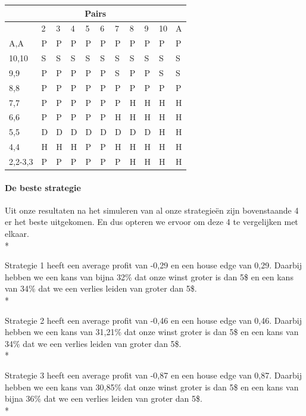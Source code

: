 \documentclass[conference]{IEEEtran}
\begin{document}
\begin{table}[ht]
\begin{tabular}{|l|l|l|l|l|l|l|l|l|l|l|}
\multicolumn{11}{|c|}{\textbf{Pairs}}                                 \\ \hline
                             & 2 & 3 & 4 & 5 & 6 & 7 & 8 & 9 & 10 & A \\ \hline
A,A                          & P & P & P & P & P & P & P & P & P & P  \\ \hline
10,10                        & S & S & S & S & S & S & S & S & S & S  \\ \hline
9,9                          & P & P & P & P & P & S & P & P & S & S  \\ \hline
8,8                          & P & P & P & P & P & P & P & P & P & P  \\ \hline
7,7                          & P & P & P & P & P & P & H & H & H & H  \\ \hline
6,6                          & P & P & P & P & P & H & H & H & H & H  \\ \hline
5,5                          & D & D & D & D & D & D & D & D & H & H  \\ \hline
4,4                          & H & H & H & P & P & H & H & H & H & H  \\ \hline
2,2-3,3                      & P & P & P & P & P & P & H & H & H & H  \\ \hline
\end{tabular}
\end{table}

\paragraph{De beste strategie}

Uit onze resultaten na het simuleren van al onze strategie\"en zijn bovenstaande 4 er het beste uitgekomen. En dus opteren we ervoor om deze 4 te vergelijken met elkaar. \\*

Strategie 1 heeft een average profit van -0,29 en een house edge van 0,29. Daarbij hebben we een kans van bijna 32\% dat onze winst groter is dan 5\$ en een kans van 34\% dat we een verlies leiden van groter dan 5\$. \\*

Strategie 2 heeft een average profit van -0,46 en een house edge van 0,46. Daarbij hebben we een kans van 31,21\% dat onze winst groter is dan 5\$ en een kans van 34\% dat we een verlies leiden van groter dan 5\$.\\*

Strategie 3 heeft een average profit van -0,87 en een house edge van 0,87. Daarbij hebben we een kans van 30,85\% dat onze winst groter is dan 5\$ en een kans van bijna 36\% dat we een verlies leiden van groter dan 5\$.\\*
\end{document}
